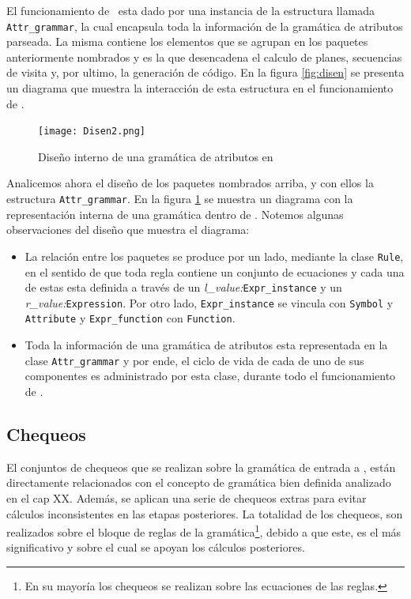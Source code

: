 El funcionamiento de \maggen\ esta dado por una instancia de la estructura llamada \texttt{Attr\_grammar}, la cual encapsula toda la información de la gramática de atributos parseada. La misma contiene los elementos que se agrupan en los paquetes anteriormente nombrados y es la que desencadena el calculo de planes, secuencias de visita y, por ultimo, la generación de código.  
En la figura \ref{fig:disen} se presenta un diagrama que muestra la interacción de esta estructura en el funcionamiento de \maggen.


\begin{figure}\centering
\texttt{[image: Disen2.png]}
\caption{\label{fig:disen2}Diseño interno de una gramática de atributos en \maggen}
\end{figure}
Analicemos ahora el diseño de los paquetes nombrados arriba, y con ellos la estructura \texttt{Attr\_grammar}.  En la figura \ref{fig:disen2} se muestra un diagrama con la representación interna de una gramática dentro de \maggen. Notemos algunas observaciones del diseño que muestra el diagrama:
\begin{itemize}
\item La relación entre los paquetes se produce por un lado, mediante la clase \texttt{Rule}, en el sentido de que toda regla contiene un conjunto de ecuaciones y cada una de estas esta definida a través de un \textit{l\_value:}\texttt{Expr\_instance} y un \textit{r\_value:}\texttt{Expression}. Por otro lado, \texttt{Expr\_instance} se vincula con \texttt{Symbol} y \texttt{Attribute} y \texttt{Expr\_function} con \texttt{Function}.

\item Toda la información de una gramática de atributos esta representada en la clase \texttt{Attr\_grammar} y por ende, el ciclo de vida de cada de uno de sus componentes es administrado por esta clase, durante todo el funcionamiento de \maggen. 
\end{itemize}



\subsection*{Chequeos}
\label{subsec:check}
El conjuntos de chequeos que se realizan sobre la gramática de entrada a \maggen, están directamente relacionados con el concepto de gramática bien definida analizado en el cap XX. Además, se aplican una serie de chequeos extras para evitar cálculos inconsistentes en las etapas posteriores. La totalidad de los chequeos, son realizados sobre el bloque de reglas de la gramática\footnote{En su mayoría los chequeos se realizan sobre las ecuaciones de las reglas.}, debido a que este, es el más significativo y sobre el cual se apoyan los cálculos posteriores.

